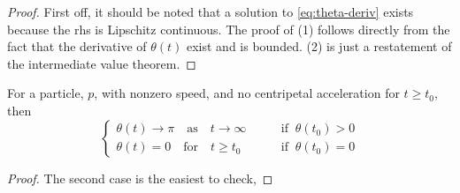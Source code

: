 \begin{proof}
First off, it should be noted that a solution to \ref{eq:theta-deriv} exists because the rhs is Lipschitz continuous. The proof of (1) follows directly from the fact that the derivative of $\theta(t)$ exist and is bounded. (2) is just a restatement of the intermediate value theorem.
\end{proof}

\begin{lemma}
  For a particle, $p$, with nonzero speed, and no centripetal acceleration for $t \ge t_0$, then
  \[
    \begin{cases}
      \theta(t) \to \pi \quad \text{as} \quad t \to \infty \qquad &\text{if} \;\; \theta(t_0) > 0\\
      \theta(t) = 0 \quad \text{for} \quad t \ge t_0 \qquad &\text{if} \;\; \theta(t_0) = 0
    \end{cases}
  \]
\end{lemma}

\begin{proof}
The second case is the easiest to check, 


\end{proof}